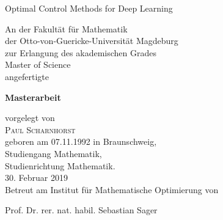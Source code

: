 
%
%
%

\begin{center}
\vspace*{1,5cm}
\begin{Large}
\doublespacing
\begin{scshape}
Optimal Control Methods for Deep Learning
\end{scshape}
\singlespacing
\end{Large}
\vspace{\fill}
An der Fakultät für Mathematik\\
der Otto-von-Guericke-Universität Magdeburg\\
zur Erlangung des akademischen Grades \\
Master of Science
\\
angefertigte\\
\vspace{\fill}
\begin{Large}
\textbf{Masterarbeit} 
\\
\end{Large}
\vspace{\fill}

vorgelegt von\\
\textsc{Paul Scharnhorst}\\
geboren am 07.11.1992 in Braunschweig,\\
Studiengang Mathematik,\\
Studienrichtung Mathematik.\\[2ex]
30. Februar 2019\\
\vspace{\fill}
Betreut am Institut für
Mathematische Optimierung
von\\
\begin{scshape}
Prof. Dr. rer. nat. habil. Sebastian Sager
\end{scshape}
\end{center}



%
\thispagestyle{empty}
